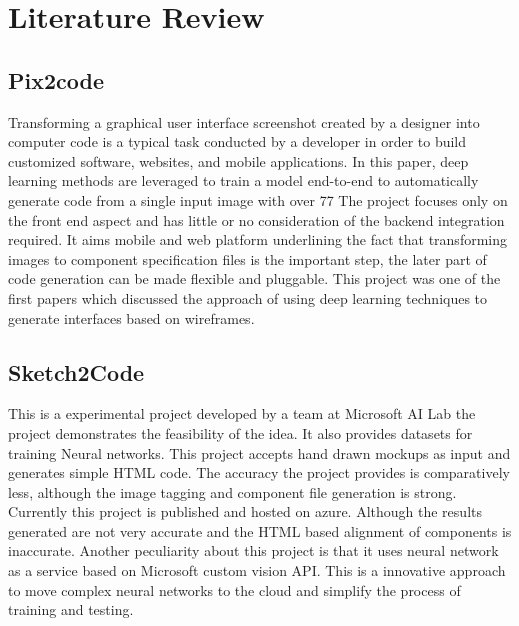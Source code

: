 
\chapter{Literature Review}

  \section{Pix2code}
    Transforming a graphical user interface screenshot created by a designer into computer code is a typical task conducted by a developer in order to build customized software, websites, and mobile applications. In this paper, deep learning methods are  leveraged to train a model end-to-end to automatically generate code from a single input image with over 77%
    The project focuses only on the front end aspect and has little or no consideration of the backend integration required. It aims mobile and web platform underlining the fact that transforming images to component specification files is the important step, the later part of code generation can be made flexible and pluggable. This project was one of the first papers which discussed the approach of using deep learning techniques to generate interfaces based on wireframes.

  \section{Sketch2Code}
    This is a experimental project developed by a team at Microsoft AI Lab the project demonstrates the feasibility of the idea. It also provides datasets for training Neural networks. This project accepts hand drawn mockups as input and generates simple HTML code. The accuracy the project provides is comparatively less, although the image tagging and component file generation is strong.
    Currently this project is published and hosted on azure. Although the results generated are not very accurate and the HTML based alignment of components is inaccurate. Another peculiarity about this project is that it uses neural network as a service based on Microsoft custom vision API. This is a innovative approach to move complex neural networks to the cloud and simplify the process of training and testing.


